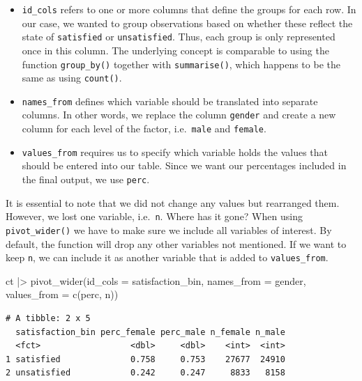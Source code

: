 \documentclass[
  letterpaper,
]{krantz}
\makeatletter
\newenvironment{Shaded}{\begin{snugshade}}{\end{snugshade}}
\newcommand{\AttributeTok}[1]{\textcolor[rgb]{0.40,0.45,0.13}{#1}}
\newcommand{\FunctionTok}[1]{\textcolor[rgb]{0.28,0.35,0.67}{#1}}
\newcommand{\NormalTok}[1]{\textcolor[rgb]{0.00,0.23,0.31}{#1}}
\newcommand{\SpecialCharTok}[1]{\textcolor[rgb]{0.37,0.37,0.37}{#1}}
\newenvironment{kframe}{%
\medskip{}
\setlength{\fboxsep}{.8em}
 \def\at@end@of@kframe{}%
 \ifinner\ifhmode%
  \def\at@end@of@kframe{\end{minipage}}%
  \begin{minipage}{\columnwidth}%
 \fi\fi%
 \def\FrameCommand##1{\hskip\@totalleftmargin \hskip-\fboxsep
 \colorbox{shadecolor}{##1}\hskip-\fboxsep
     \hskip-\linewidth \hskip-\@totalleftmargin \hskip\columnwidth}%
 \MakeFramed {\advance\hsize-\width
   \@totalleftmargin\z@ \linewidth\hsize
   \@setminipage}}%
 {\par\unskip\endMakeFramed%
 \at@end@of@kframe}
\renewenvironment{Shaded}{\begin{kframe}}{\end{kframe}}
\makeatother
\begin{document}
\begin{itemize}
\item
  \texttt{id\_cols} refers to one or more columns that define the groups
  for each row. In our case, we wanted to group observations based on
  whether these reflect the state of \texttt{satisfied} or
  \texttt{unsatisfied}. Thus, each group is only represented once in
  this column. The underlying concept is comparable to using the
  function \texttt{group\_by()} together with \texttt{summarise()},
  which happens to be the same as using \texttt{count()}.
\item
  \texttt{names\_from} defines which variable should be translated into
  separate columns. In other words, we replace the column
  \texttt{gender} and create a new column for each level of the factor,
  i.e.~\texttt{male} and \texttt{female}.
\item
  \texttt{values\_from} requires us to specify which variable holds the
  values that should be entered into our table. Since we want our
  percentages included in the final output, we use \texttt{perc}.
\end{itemize}

It is essential to note that we did not change any values but rearranged
them. However, we lost one variable, i.e.~\texttt{n}. Where has it gone?
When using \texttt{pivot\_wider()} we have to make sure we include all
variables of interest. By default, the function will drop any other
variables not mentioned. If we want to keep \texttt{n}, we can include
it as another variable that is added to \texttt{values\_from}.

\begin{Shaded}
\begin{Highlighting}[]
\NormalTok{ct }\SpecialCharTok{|\textgreater{}} \FunctionTok{pivot\_wider}\NormalTok{(}\AttributeTok{id\_cols =}\NormalTok{ satisfaction\_bin,}
                   \AttributeTok{names\_from =}\NormalTok{ gender,}
                   \AttributeTok{values\_from =} \FunctionTok{c}\NormalTok{(perc, n))}
\end{Highlighting}
\end{Shaded}

\begin{verbatim}
# A tibble: 2 x 5
  satisfaction_bin perc_female perc_male n_female n_male
  <fct>                  <dbl>     <dbl>    <int>  <int>
1 satisfied              0.758     0.753    27677  24910
2 unsatisfied            0.242     0.247     8833   8158
\end{verbatim}
\end{document}
